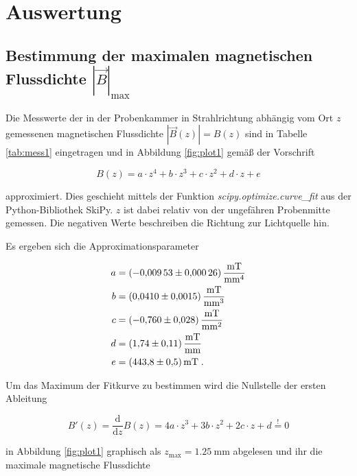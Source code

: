 \section{Auswertung}
\label{sec:Auswertung}

\subsection{Bestimmung der maximalen magnetischen Flussdichte $|\vec{B}|_\text{max}$}

Die Messwerte der in der Probenkammer in Strahlrichtung abhängig vom Ort $z$ gemessenen magnetischen Flussdichte
$|\vec{B}(z)| = B(z)$ sind in Tabelle \ref{tab:mess1} eingetragen und in Abbildung \ref{fig:plot1} gemäß
der Vorschrift

\begin{equation}
    B(z) = a \cdot z^4 + b \cdot z^3 + c \cdot z^2 + d \cdot z + e
\end{equation}

approximiert. Dies geschieht mittels der Funktion \textit{scipy.optimize.curve\_fit} aus der Python-Bibliothek SkiPy.
$z$ ist dabei relativ von der ungefähren Probenmitte gemessen. Die negativen Werte beschreiben die Richtung zur Lichtquelle hin. 

Es ergeben sich die Approximationsparameter

\begin{align*}
    a &= \SI{-0.00953 +- 0.00026}{\milli\tesla\per\milli\meter\tothe{4}} \\
    b &= \SI{ 0.0410  +- 0.0015 }{\milli\tesla\per\milli\meter\tothe{3}} \\
    c &= \SI{-0.760   +- 0.028  }{\milli\tesla\per\milli\meter\tothe{2}} \\
    d &= \SI{ 1.74    +- 0.11   }{\milli\tesla\per\milli\meter}          \\
    e &= \SI{ 443.8   +- 0.5    }{\milli\tesla} \; .
\end{align*}

Um das Maximum der Fitkurve zu bestimmen wird die Nullstelle der ersten Ableitung

\begin{equation}
    B'(z) = \frac{\text{d}}{\text{d}z} B(z) = 4a \cdot z^3 + 3b \cdot z^2 + 2c \cdot z + d \stackrel{!}{=} 0
\end{equation}

in Abbildung \ref{fig:plot1} graphisch als $z_\text{max} = \SI{1.25}{\milli\meter}$ abgelesen und ihr die maximale magnetische Flussdichte

